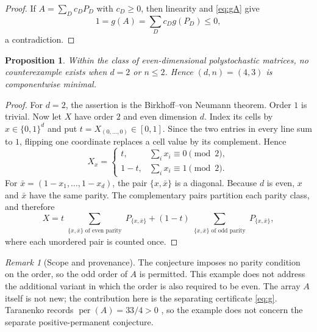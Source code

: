 \documentclass[11pt]{amsart}
\newtheorem{proposition}[theorem]{Proposition}
\theoremstyle{remark}
\newtheorem{remark}[theorem]{Remark}
\begin{document}
\begin{proof}
If $A=\sum_D c_D P_D$ with $c_D\geq0$, then linearity and
\eqref{eq:gA} give
\[
  1=g(A)=\sum_D c_D g(P_D)\leq0,
\]
a contradiction.
\end{proof}

\begin{proposition}\label{prop:minimal}
Within the class of even-dimensional polystochastic matrices, no
counterexample exists when $d=2$ or $n\leq2$. Hence $(d,n)=(4,3)$ is
componentwise minimal.
\end{proposition}

\begin{proof}
For $d=2$, the assertion is the Birkhoff--von Neumann theorem. Order $1$ is
trivial. Now let $X$ have order $2$ and even dimension $d$. Index its cells
by $x\in\{0,1\}^d$ and put $t=X_{(0,\ldots,0)}\in[0,1]$. Since the
two entries in every line sum to $1$, flipping one coordinate replaces a
cell value by its complement. Hence
\[
  X_x=
  \begin{cases}
    t,&\sum_i x_i\equiv0\pmod2,\\
    1-t,&\sum_i x_i\equiv1\pmod2.
  \end{cases}
\]
For $\bar x=(1-x_1,\ldots,1-x_d)$, the pair $\{x,\bar x\}$ is a diagonal.
Because $d$ is even, $x$ and $\bar x$ have the same parity. The complementary
pairs partition each parity class, and therefore
\[
  X=
  t\sum_{\substack{\{x,\bar x\}\text{ of even parity}}}
       P_{\{x,\bar x\}}
  +(1-t)\sum_{\substack{\{x,\bar x\}\text{ of odd parity}}}
       P_{\{x,\bar x\}},
\]
where each unordered pair is counted once.
\end{proof}

\begin{remark}[Scope and provenance]
The conjecture imposes no parity condition on the order, so the odd order of
$A$ is permitted. This example does not address the additional variant in
which the order is also required to be even. The array $A$ itself is not new;
the contribution here is the separating certificate \eqref{eq:g}.
Taranenko records $\operatorname{per}(A)=33/4>0$
\cite[Appendix, item~4]{Taranenko2025}, so the example does not concern the
separate positive-permanent conjecture.
\end{remark}
\end{document}
